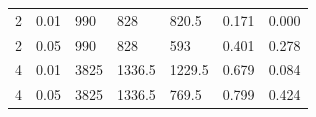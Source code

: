 \begin{tabular}{lllllll}
2 & 0.01 & 990 & 828 & 820.5 & 0.171 & 0.000 \\
2 & 0.05 & 990 & 828 & 593 & 0.401 & 0.278 \\
4 & 0.01 & 3825 & 1336.5 & 1229.5 & 0.679 & 0.084 \\
4 & 0.05 & 3825 & 1336.5 & 769.5 & 0.799 & 0.424 \\
\end{tabular}
